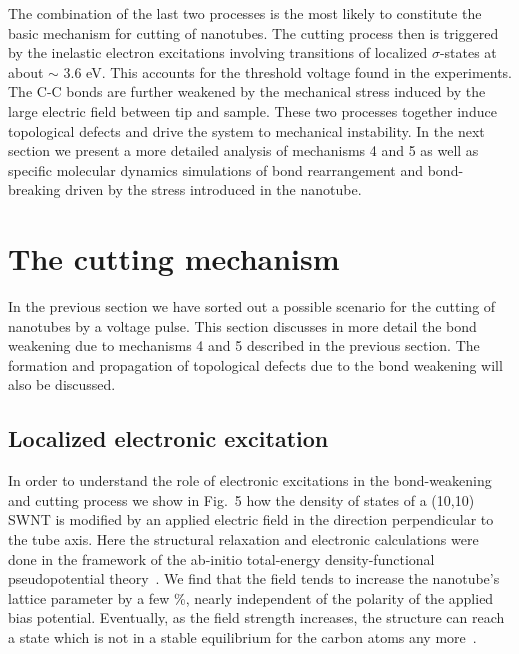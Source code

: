 \begin{multicols}{2}
The combination of the last two processes is the most likely to
constitute the basic mechanism for cutting of nanotubes. The
cutting process then is triggered by the inelastic electron
excitations involving transitions of localized $\sigma$-states at
about $\sim$ 3.6 eV. This accounts for the threshold voltage found
in the experiments. The C-C bonds are further weakened by the
mechanical stress induced by the large electric field between tip
and sample. These two processes together induce topological
defects and drive the system to mechanical instability. In the
next section we present a more detailed analysis of mechanisms 4
and 5 as well as specific molecular dynamics simulations of bond
rearrangement and bond-breaking driven by the stress introduced in
the nanotube.


\section{The cutting mechanism}

In the previous section we have sorted out a possible scenario for
the cutting of nanotubes by a voltage pulse. This section
discusses in more detail the bond weakening due to mechanisms 4
and 5 described in the previous section. The formation and
propagation of topological defects due to the bond weakening will
also be discussed.


\subsection{Localized electronic excitation}

In order to understand the role of electronic excitations in the
bond-weakening\cite{dimer} and cutting process we show in Fig.~5
how the density of states of a (10,10) SWNT is modified by an
applied electric field in the direction perpendicular to the tube
axis. Here the structural relaxation and electronic calculations
were done in the framework of the ab-initio total-energy
density-functional pseudopotential theory~\cite{ar3}. We find that
the field tends to increase the nanotube's lattice parameter by a
few \%, nearly independent of the polarity of the applied bias
potential. Eventually, as the field strength increases, the
structure can reach a state which is not in a stable equilibrium
for the carbon atoms any more~\cite{Tomanek}.


\end{multicols}
